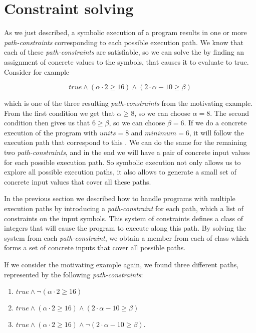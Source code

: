 		
\section{Constraint solving}
	As we just described, a symbolic execution of a program results in one or more \emph{path-constraints} corresponding to each possible execution path. We know that each of these \emph{path-constraints} are satisfiable, so we can solve the \pc by finding an assignment of concrete values to the symbols, that causes it to evaluate to true. Consider for example 
	
	\begin{equation*}
		true \land (\alpha \cdot 2 \geq 16) \land (2\cdot \alpha - 10 \geq \beta)
	\end{equation*}
	
	which is one of the three resulting \emph{path-constraints} from the motivating example. From the first condition we get that $\alpha \geq 8$, so we can choose $\alpha = 8$. The second condition then gives us that $6 \geq \beta$, so we can choose $\beta = 6$. If we do a concrete execution of the program with $units = 8$ and $minimum = 6$, it will follow the execution path that correspond to this \pc. We can do the same for the remaining two \emph{path-constraints}, and in the end we will have a pair of concrete input values for each possible execution path. So symbolic execution not only allows us to explore all possible execution paths, it also allows to generate a small set of concrete input values that cover all these paths.  

	
	\iffalse
	In the previous section we described how to handle programs with multiple execution paths by introducing a \emph{path-constraint} for each path, which a list of constraints on the input symbols. This system of constraints defines a class of integers that will cause the program to execute along this path. By solving the system from each \emph{path-constraint}, we obtain a member from each of class which forms a set of concrete inputs that cover all possible paths.    
	
	If we consider the motivating example again, we found three different paths, represented by the following \emph{path-constraints}:
	\begin{enumerate}
		\item $true \land \neg (\alpha \cdot 2 \geq 16)$
		\item $true \land (\alpha \cdot 2 \geq 16) \land (2\cdot \alpha - 10 \geq \beta)$
		\item $true \land (\alpha \cdot 2 \geq 16) \land \neg (2\cdot \alpha - 10 \geq \beta)$.
	\end{enumerate}
	

